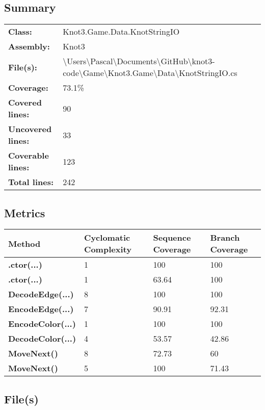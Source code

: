 \documentclass[a4paper,10pt]{article}
\begin{document}
\subsection{Summary}
\begin{longtable}[l]{ll}
\textbf{Class:} & Knot3.Game.Data.KnotStringIO\\
\textbf{Assembly:} & Knot3\\
\textbf{File(s):} & \begin{minipage}[t]{12cm}{\textbackslash Users\textbackslash Pascal\textbackslash Documents\textbackslash GitHub\textbackslash knot3-code\textbackslash Game\textbackslash Knot3.Game\textbackslash Data\textbackslash KnotStringIO.cs}\end{minipage} \\
\textbf{Coverage:} & 73.1\%\\
\textbf{Covered lines:} & 90\\
\textbf{Uncovered lines:} & 33\\
\textbf{Coverable lines:} & 123\\
\textbf{Total lines:} & 242\\
\end{longtable}
\subsection{Metrics}
\begin{longtable}[l]{|l|l|l|l|}
\hline
\textbf{Method} & \textbf{Cyclomatic Complexity} & \textbf{Sequence Coverage} & \textbf{Branch Coverage}\\
\hline
\textbf{.ctor(...)} & 1 & 100 & 100\\
\hline
\textbf{.ctor(...)} & 1 & 63.64 & 100\\
\hline
\textbf{DecodeEdge(...)} & 8 & 100 & 100\\
\hline
\textbf{EncodeEdge(...)} & 7 & 90.91 & 92.31\\
\hline
\textbf{EncodeColor(...)} & 1 & 100 & 100\\
\hline
\textbf{DecodeColor(...)} & 4 & 53.57 & 42.86\\
\hline
\textbf{MoveNext()} & 8 & 72.73 & 60\\
\hline
\textbf{MoveNext()} & 5 & 100 & 71.43\\
\hline
\end{longtable}
\subsection{File(s)}
\end{document}
